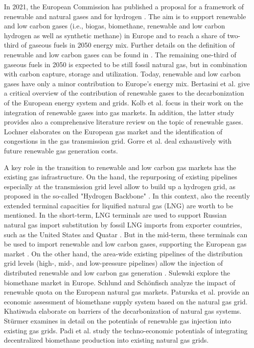 In 2021, the European Commission has published a proposal for a framework of renewable and natural gases and for hydrogen \cite{regulation_renewable_gases}. The aim is to support renewable and low carbon gases (i.e., biogas, biomethane, renewable and low carbon hydrogen as well as synthetic methane) in Europe and to reach a share of two-third of gaseous fuels in 2050 energy mix. Further details on the definition of renewable and low carbon gases can be found in \cite{briefing_renewable_gases}. The remaining one-third of gaseous fuels in 2050 is expected to be still fossil natural gas, but in combination with carbon capture, storage and utilization. Today, renewable and low carbon gases have only a minor contribution to Europe's energy mix. Bertasini et al. \cite{bertasini2023decarbonization} give a critical overview of the contribution of renewable gases to the decarbonization of the European energy system and grids. Kolb et al. \cite{kolb2021scenarios} focus in their work on the integration of renewable gases into gas markets. In addition, the latter study provides also a comprehensive literature review on the topic of renewable gases. Lochner \cite{lochner2011identification} elaborates on the European gas market and the identification of congestions in the gas transmission grid. Gorre et al. \cite{gorre2019production} deal exhaustively with future renewable gas generation costs.\vspace{0.3cm}

A key role in the transition to renewable and low carbon gas markets has the existing gas infrastructure. On the hand, the repurposing of existing pipelines especially at the transmission grid level allow to build up a hydrogen grid, as proposed in the so-called "Hydrogen Backbone" \cite{hydrogen_backbone}. In this context, also the recently extended terminal capacities for liquified natural gas (LNG) are worth to be mentioned. In the short-term, LNG terminals are used to support Russian natural gas import substitution by fossil LNG imports from exporter countries, such as the United States and Quatar \cite{brauers2021liquefied}. But in the mid-term, these terminals can be used to import renewable and low carbon gases, supporting the European gas market \cite{al2022emerging}. On the other hand, the area-wide existing pipelines of the distribution grid levels (high-, mid-, and low-pressure pipelines) allow the injection of distributed renewable and low carbon gas generation \cite{cucchiella2018profitability}. Sulewski \cite{sulewski2023development} explore the biomethane market in Europe. Schlund and Schönfisch \cite{schlund2021analysing} analyze the impact of renewable quota on the European natural gas markets. Paturska et al. \cite{paturska2015economic} provide an economic assessment of biomethane supply system based on the natural gas grid. Khatiwada \cite{khatiwada2022decarbonization} elaborate on barriers of the decarbonization of natural gas systems. Stürmer \cite{sturmer2020greening} examines in detail on the potentials of renewable gas injection into existing gas grids. Padi et al. \cite{padi2023techno} study the techno-economic potentials of integrating decentralized biomethane production into existing natural gas grids.

